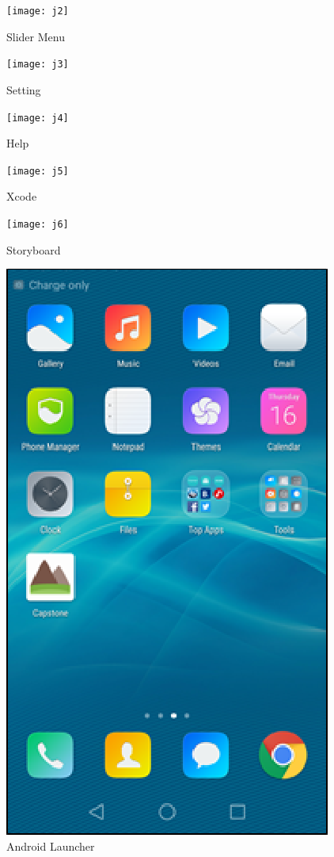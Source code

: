 \documentclass[letterpaper, 10pt,titlepage]{article}
\begin{document}
\begin{figure}[ht]
    \centering
    \texttt{[image: j2]}
    \caption{Slider Menu}
    \label{jiawei2}
\end{figure}

\begin{figure}[ht]
    \centering
    \texttt{[image: j3]}
    \caption{Setting}
    \label{jiawei3}
\end{figure}

\begin{figure}[ht]
    \centering
    \texttt{[image: j4]}
    \caption{Help}
    \label{jiawei4}
\end{figure}

\begin{figure}[ht]
    \centering
    \texttt{[image: j5]}
    \caption{Xcode}
    \label{jiawei5}
\end{figure}

\begin{figure}[ht]
    \centering
    \texttt{[image: j6]}
    \caption{Storyboard}
    \label{jiawei6}
\end{figure}

\begin{figure}[ht]
    \centering
    \includegraphics[scale=1.2]{android1}
    \caption{Android Launcher}
    \label{charles1}
\end{figure}
\end{document}
